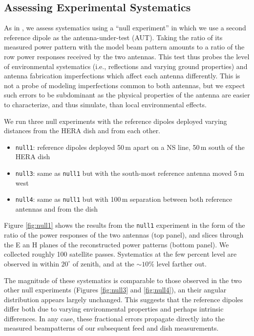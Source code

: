 \documentclass{emulateapj}
\begin{document}

\subsection{Assessing Experimental Systematics}

As in \citet{neben15}, we assess systematics using a ``null experiment'' in which we use a second reference dipole as the antenna-under-test (AUT). Taking the ratio of its measured power pattern with the model beam pattern amounts to a ratio of the row power responses received by the two antennas. This test thus probes the level of environmental systematics (i.e., reflections and varying ground properties) and antenna fabrication imperfections which affect each antenna differently. This is not a probe of modeling imperfections common to both antennas, but we expect such errors to be subdominant as the physical properties of the antenna are easier to characterize, and thus simulate, than local environmental effects. 

We run three null experiments with the reference dipoles deployed varying distances from the HERA dish and from each other.

\begin{itemize}
\item \texttt{null1}: reference dipoles deployed 50\,m apart on a NS line, 50\,m south of the HERA dish
\item \texttt{null3}: same as \texttt{null1} but with the south-most reference antenna moved 5\,m west
\item \texttt{null4}: same as \texttt{null1} but with 100\,m separation between both reference antennas and from the dish
\end{itemize}

Figure \ref{fig:null1} shows the results from the \texttt{null1} experiment in the form of the ratio of the power responses of the two antennas (top panel), and slices through the E an H planes of the reconstructed power patterns (bottom panel). We collected roughly 100 satellite passes. Systematics at the few percent level are observed in  within $20^\circ$ of zenith, and at the $\sim10\%$ level farther out.

The magnitude of these systematics is comparable to those observed in the two other null experiments (Figures \ref{fig:null3} and \ref{fig:null4}), an their angular distribution appears largely unchanged. This suggests that the reference dipoles differ both due to varying environmental properties and perhaps intrinsic differences. In any case, these fractional errors propagate directly into the measured beampatterns of our subsequent feed and dish measurements.  
\end{document}
